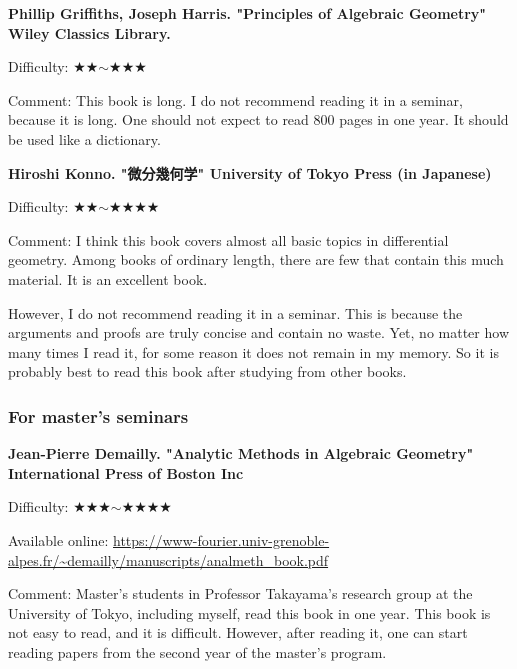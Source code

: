\textbf{Phillip Griffiths, Joseph Harris. "Principles of Algebraic Geometry" Wiley Classics Library.}  \vspace{-6pt} 

Difficulty: ★★$\sim$★★★ \vspace{-6pt} 

Comment: This book is long. I do not recommend reading it in a seminar, because it is long. One should not expect to read 800 pages in one year. It should be used like a dictionary.
\vspace{8pt}

\textbf{Hiroshi Konno. "微分幾何学" University of Tokyo Press  (in Japanese)}  \vspace{-6pt} 

Difficulty: ★★$\sim$★★★★ \vspace{-6pt} 

Comment: I think this book covers almost all basic topics in differential geometry. Among books of ordinary length, there are few that contain this much material. It is an excellent book.

However, I do not recommend reading it in a seminar. This is because the arguments and proofs are truly concise and contain no waste. Yet, no matter how many times I read it, for some reason it does not remain in my memory. So it is probably best to read this book after studying from other books.

\subsubsection{For master's seminars}

\textbf{Jean-Pierre Demailly. "Analytic Methods in Algebraic Geometry"  International Press of Boston Inc} \vspace{-6pt}

Difficulty: ★★★$\sim$★★★★ \vspace{-6pt} 

Available online: \url{https://www-fourier.univ-grenoble-alpes.fr/~demailly/manuscripts/analmeth_book.pdf}\vspace{-6pt}

Comment: Master's students in Professor Takayama's research group at the University of Tokyo, including myself, read this book in one year.  This book is not easy to read, and it is difficult. However, after reading it, one can start reading papers from the second year of the master's program.

